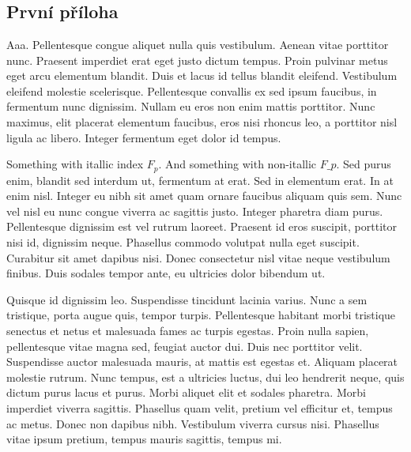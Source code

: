 \chapter*{\AppendicesWord}
\renewcommand{\thesection}{\Alph{section}}

\pagestyle{fancy}
\fancyfoot{}
\fancyhead[RO,LE]{\thepage}
\fancyhead[RE]{\AppendicesWord}
\fancyhead[LO]{\nouppercase{\rightmark}}

\section{První příloha}
Aaa.
Pellentesque congue aliquet nulla quis vestibulum. Aenean vitae porttitor nunc. Praesent imperdiet erat eget justo dictum tempus. Proin pulvinar metus eget arcu elementum blandit. Duis et lacus id tellus blandit eleifend. Vestibulum eleifend molestie scelerisque. Pellentesque convallis ex sed ipsum faucibus, in fermentum nunc dignissim. Nullam eu eros non enim mattis porttitor. Nunc maximus, elit placerat elementum faucibus, eros nisi rhoncus leo, a porttitor nisl ligula ac libero. Integer fermentum eget dolor id tempus.

Something with itallic index $F_p$. And something with non-itallic $F\_p$. Sed purus enim, blandit sed interdum ut, fermentum at erat. Sed in elementum erat. In at enim nisl. Integer eu nibh sit amet quam ornare faucibus aliquam quis sem. Nunc vel nisl eu nunc congue viverra ac sagittis justo. Integer pharetra diam purus. Pellentesque dignissim est vel rutrum laoreet. Praesent id eros suscipit, porttitor nisi id, dignissim neque. Phasellus commodo volutpat nulla eget suscipit. Curabitur sit amet dapibus nisi. Donec consectetur nisl vitae neque vestibulum finibus. Duis sodales tempor ante, eu ultricies dolor bibendum ut.

Quisque id dignissim leo. Suspendisse tincidunt lacinia varius. Nunc a sem tristique, porta augue quis, tempor turpis. Pellentesque habitant morbi tristique senectus et netus et malesuada fames ac turpis egestas. Proin nulla sapien, pellentesque vitae magna sed, feugiat auctor dui. Duis nec porttitor velit. Suspendisse auctor malesuada mauris, at mattis est egestas et. Aliquam placerat molestie rutrum. Nunc tempus, est a ultricies luctus, dui leo hendrerit neque, quis dictum purus lacus et purus. Morbi aliquet elit et sodales pharetra. Morbi imperdiet viverra sagittis. Phasellus quam velit, pretium vel efficitur et, tempus ac metus. Donec non dapibus nibh. Vestibulum viverra cursus nisi. Phasellus vitae ipsum pretium, tempus mauris sagittis, tempus mi.

